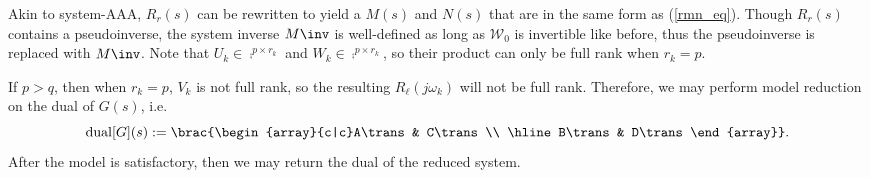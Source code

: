 \documentclass[letterpaper, 10 pt, conference]{ieeeconf}  %
\newcommand{\mcal}[1]{\mathcal{#1}}
\begin{document}
\begin{comment} THE FOLLOWING IS INCORRECT
\begin{theorem}
        If \(U_k\Sigma_k V_k^*\) is a rank \(r_k\) approximation of \(G(j\omega_k)\), then 
        \[\lim_{\omega\to\omega_k}R_r(j\omega) = U_k\Sigma_k V_k^*\]  
        \noindent
        \begin{proof}
                Let \(\omega_i\) be one of the \(\omega_k\)s.  Then,
                \begin{align*}
                    \hat{R}(s) &= \frac{s-j\omega_i}{s-j\omega_i} R_r(s) = \\
                    & \p{W_iU_i^* + \sum_{i\neq k = 1}^r \frac{(s-j\omega_i)W_kU_k^*}{s-j\omega_k}}^\dagger \\
                    & \p{W_i\Sigma_iV_i^* + \sum_{i\neq k = 1}^r \frac{(s-j\omega_i)W_k\Sigma_kV_k^*}{s-j\omega_k}} \\
                    \lim_{s\to j\omega_i} \hat{R}(s) &= \p{W_i U_i^*}^\dagger \p{W_i \Sigma_i V_i^*} \\
                    \shortintertext{Assuming \(W_i\) is full rank,}
                    \p{W_i U_i^*}^\dagger &= U_i \cancel{(U_i^* U_i)\inv} \p{W_i^* W_i}\inv W_i^* \\
                    \shortintertext{Therefore}
                    \lim_{s\to j\omega_i} \hat{R}(s) &= U_i \cancel{(W_i^*W_i)\inv W_i^* W_i} \Sigma_i V_i^* = U_k\Sigma_k V_k^*
                \end{align*}
        \end{proof}
\end{theorem}
\end{comment}

Akin to system-AAA, \(R_r(s)\) can be rewritten to yield a \(M(s)\) and \(N(s)\) that are in the same form as (\ref{rmn_eq}).  Though \(R_r(s)\) contains a pseudoinverse, the system inverse \(M\inv\) is well-defined as long as \(\mcal{W}_0\) is invertible like before, thus the pseudoinverse is replaced with \(M\inv\).  Note that \(U_k \in\comp^{p\times r_k}\) and \(W_k\in\comp^{p\times r_k}\), so their product can only be full rank when \(r_k = p\).  
\begin{remark}
If \(p>q\), then when \(r_k = p\), \(V_k\) is not full rank, so the resulting \(R_\ell(j\omega_k)\) will not be full rank.  Therefore, we may perform model reduction on the dual of \(G(s)\), i.e. 
\[\mathrm{dual}[G](s) := \brac{\begin{array}{c|c}A\trans & C\trans \\ \hline B\trans & D\trans\end{array}}.\]
After the model is satisfactory, then we may return the dual of the reduced system.  
\end{remark}
\end{document}
